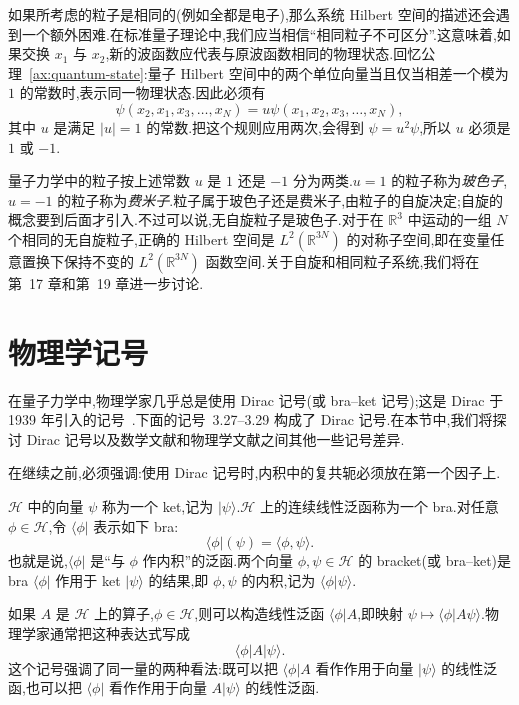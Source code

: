 如果所考虑的粒子是相同的(例如全都是电子),那么系统 Hilbert 空间的描述还会遇到一个额外困难.在标准量子理论中,我们应当相信“相同粒子不可区分”.这意味着,如果交换 \(x_{1}\) 与 \(x_{2}\),新的波函数应代表与原波函数相同的物理状态.回忆公理~\ref{ax:quantum-state}:量子 Hilbert 空间中的两个单位向量当且仅当相差一个模为 \(1\) 的常数时,表示同一物理状态.因此必须有
\[
\psi(x_{2},x_{1},x_{3},\ldots,x_{N})
=u\psi(x_{1},x_{2},x_{3},\ldots,x_{N}),
\]
其中 \(u\) 是满足 \(|u|=1\) 的常数.把这个规则应用两次,会得到 \(\psi=u^{2}\psi\),所以 \(u\) 必须是 \(1\) 或 \(-1\).

量子力学中的粒子按上述常数 \(u\) 是 \(1\) 还是 \(-1\) 分为两类.\(u=1\) 的粒子称为\emph{玻色子},\(u=-1\) 的粒子称为\emph{费米子}.粒子属于玻色子还是费米子,由粒子的自旋决定;自旋的概念要到后面才引入.不过可以说,无自旋粒子是玻色子.对于在 \(\mathbb{R}^{3}\) 中运动的一组 \(N\) 个相同的无自旋粒子,正确的 Hilbert 空间是 \(L^{2}(\mathbb{R}^{3N})\) 的对称子空间,即在变量任意置换下保持不变的 \(L^{2}(\mathbb{R}^{3N})\) 函数空间.关于自旋和相同粒子系统,我们将在第~17 章和第~19 章进一步讨论.

\section{物理学记号}\label{sec:physics-notation}

在量子力学中,物理学家几乎总是使用 Dirac 记号(或 bra--ket 记号);这是 Dirac 于 1939 年引入的记号~\cite{Dirac1939}.下面的记号~3.27--3.29 构成了 Dirac 记号.在本节中,我们将探讨 Dirac 记号以及数学文献和物理学文献之间其他一些记号差异.

在继续之前,必须强调:使用 Dirac 记号时,内积中的复共轭必须放在第一个因子上.

\begin{definition}\label{def:bra-ket}
\(\mathcal{H}\) 中的向量 \(\psi\) 称为一个 ket,记为 \(\lvert\psi\rangle\).\(\mathcal{H}\) 上的连续线性泛函称为一个 bra.对任意 \(\phi\in\mathcal{H}\),令 \(\langle\phi\rvert\) 表示如下 bra:
\[
\langle\phi\rvert(\psi)=\langle\phi,\psi\rangle.
\]
也就是说,\(\langle\phi\rvert\) 是“与 \(\phi\) 作内积”的泛函.两个向量 \(\phi,\psi\in\mathcal{H}\) 的 bracket(或 bra--ket)是 bra \(\langle\phi\rvert\) 作用于 ket \(\lvert\psi\rangle\) 的结果,即 \(\phi,\psi\) 的内积,记为 \(\langle\phi\vert\psi\rangle\).
\end{definition}

如果 \(A\) 是 \(\mathcal{H}\) 上的算子,\(\phi\in\mathcal{H}\),则可以构造线性泛函 \(\langle\phi\rvert A\),即映射 \(\psi\mapsto\langle\phi\rvert A\psi\rangle\).物理学家通常把这种表达式写成
\[
\langle\phi\vert A\vert\psi\rangle.
\]
这个记号强调了同一量的两种看法:既可以把 \(\langle\phi\vert A\) 看作作用于向量 \(\lvert\psi\rangle\) 的线性泛函,也可以把 \(\langle\phi\vert\) 看作作用于向量 \(A\lvert\psi\rangle\) 的线性泛函.

